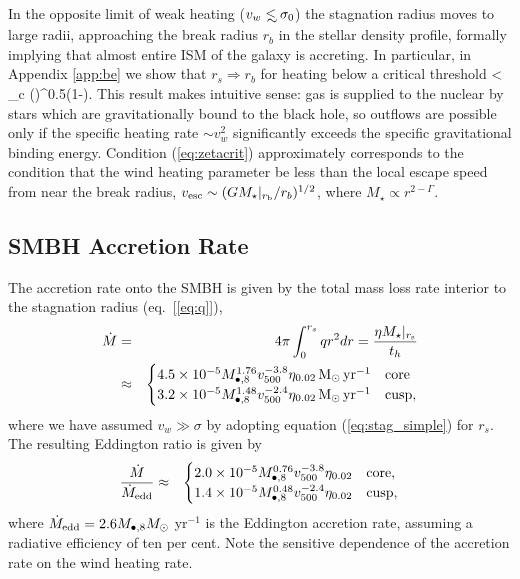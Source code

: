 \documentclass[usenatbib,fleqn]{mn2e}
\newcommand\lsim{\mathrel{\rlap{\lower4pt\hbox{\hskip1pt$\sim$}}
    \raise1pt\hbox{$<$}}}
\newcommand{\rs}{r_s}
\newcommand{\rb}{r_b}
\newcommand{\Mbheight}{M_{\bullet,8}}
\newcommand{\soi}{\rm inf}
\newcommand{\rsoi}{r_{\soi}}
\newcommand{\pyear}{{\rm yr}^{-1}}
\renewcommand{\th}{t_h}
\begin{document}
In the opposite limit of weak heating ($v_w\lsim \sigma_0$) the
stagnation radius moves to large radii, approaching the break radius
$\rb$ in the stellar density profile, formally implying that almost
entire ISM of the galaxy is accreting.  In particular, in Appendix
\ref{app:be} we show that $\rs \Rightarrow \rb$ for heating below a
critical threshold \be \zeta\equiv {} <
\zeta_c \approx \left(\frac{\rb}{\rsoi}\right)^{0.5(1-\Gamma)}.
\label{eq:zetacrit}
\ee This result makes intuitive sense: gas is supplied to the nuclear
by stars which are gravitationally bound to the black hole, so
outflows are possible only if the specific heating rate $\sim
v_{w}^{2}$ significantly exceeds the specific gravitational binding
energy.  Condition (\ref{eq:zetacrit}) approximately corresponds to
the condition that the wind heating parameter be less than the local escape
speed from near the break radius, $v_{\rm esc} \sim (GM_{\star}|_{r_{\rm
    b}}/r_b)^{1/2}$, where $M_{\star} \propto r^{2-\Gamma}$.

\subsection{SMBH Accretion Rate}

The accretion rate onto the SMBH is given by the total mass loss rate interior to the stagnation radius (eq.~[\ref{eq:q}]), 
\begin{eqnarray}
  \dot{M} &=& 4\pi \int_{0}^{r_{s}}q r^{2}dr = \frac{\eta M_{\star}|_{r_{\rm s}}}{\th} \nonumber \\
&\approx&
  \begin{cases}
    4.5 \times 10^{-5} M_{\bullet,8}^{1.76}
    v_{500}^{-3.8}  \eta_{0.02} \Msun \, \pyear& \text{core} \\
    3.2 \times 10^{-5} M_{\bullet,8}^{1.48} 
    v_{500}^{-2.4}  \eta_{0.02} \Msun \, \pyear  & \text{cusp}, 
  \end{cases}
  \label{eq:mdot_analytic}
\end{eqnarray}
where we have assumed $v_{w} \gg \sigma$ by adopting equation
(\ref{eq:stag_simple}) for $r_s$.  The resulting Eddington ratio is
given by
\begin{eqnarray}
\frac{\dot{M}}{\dot{M}_{\rm edd}} &\approx&
  \begin{cases}
    2.0 \times 10^{-5} M_{\bullet,8}^{0.76}
    v_{500}^{-3.8}  \eta_{0.02}   & \text{core}, \\
    1.4 \times 10^{-5} \Mbheight^{0.48} 
    v_{500}^{-2.4}  \eta_{0.02}   & \text{cusp}, 
  \end{cases}
  \label{eq:eddr_analytic}
\end{eqnarray}
where $\dot{M}_{\rm edd} = 2.6M_{\bullet,8}M_{\odot}$ yr$^{-1}$ is the
Eddington accretion rate, assuming a radiative efficiency of ten per
cent.  Note the sensitive dependence of the accretion rate on the wind
heating rate.
\end{document}
